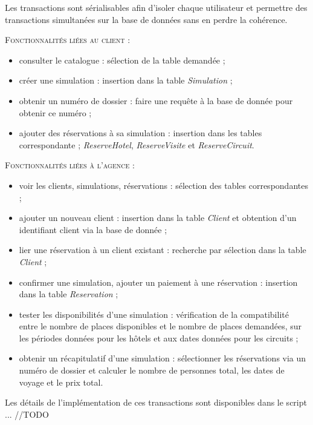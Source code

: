 \documentclass[french]{article}
\theoremstyle{break}
\begin{document}
Les transactions sont sérialisables afin d'isoler chaque utilisateur et permettre des transactions simultanées sur la base de données sans en perdre la cohérence.

\vspace{0.3cm}
\textsc{Fonctionnalités liées au client :}
\vspace{0.3cm}
\begin{itemize}
\item consulter le catalogue : sélection de la table demandée ;
\item créer une simulation : insertion dans la table \textit{Simulation} ;
\item obtenir un numéro de dossier : faire une requête à la base de donnée pour obtenir ce numéro ;
\item ajouter des réservations à sa simulation : insertion dans les tables correspondante ; \textit{ReserveHotel}, \textit{ReserveVisite} et \textit{ReserveCircuit}.
\end{itemize}

\vspace{0.3cm}
\textsc{Fonctionnalités liées à l'agence :}
\vspace{0.3cm}
\begin{itemize}
\item voir les clients, simulations, réservations : sélection des tables correspondantes ;
\item ajouter un nouveau client : insertion dans la table \textit{Client} et obtention d'un identifiant client via la base de donnée ;
\item lier une réservation à un client existant : recherche par sélection dans la table \textit{Client} ;
\item confirmer une simulation, ajouter un paiement à une réservation : insertion dans la table \textit{Reservation} ;
\item tester les disponibilités d'une simulation : vérification de la compatibilité entre le nombre de places disponibles et le nombre de places demandées, sur les périodes données pour les hôtels et aux dates données pour les circuits ;
\item obtenir un récapitulatif d'une simulation : sélectionner les réservations via un numéro de dossier et calculer le nombre de personnes total, les dates de voyage et le prix total.
\end{itemize}


Les détails de l'implémentation de ces transactions sont disponibles dans le script ... //TODO
\end{document}
